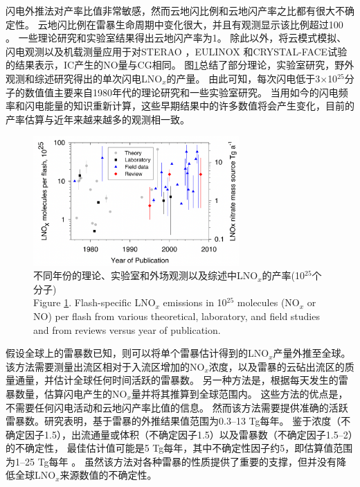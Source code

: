

闪电外推法对产率比值非常敏感\citep{Bond.2002}，然而云地闪比例和云地闪产率之比都有很大不确定性。
云地闪比例在雷暴生命周期中变化很大，并且有观测显示该比例超过100 \citep{Dye.2000,DeCaria.2005,Ott.2007}。
一些理论研究\citep{Cooray.1997}和实验室结果\citep{Cooray.2005}得出云地闪产率为1。
除此以外，将云模式模拟、闪电观测以及机载测量应用于对STERAO \citep{DeCaria.2000}，EULINOX \citep{Fehr.2004}和CRYSTAL-FACE试验的结果表示，IC产生的NO量与CG相同。
图\ref{figure:lnox_production_Schumann}总结了部分理论，实验室研究，野外观测和综述研究得出的单次闪电LNO$_x$的产量。
由此可知，每次闪电低于3$\times$10$^{25}$分子的数值值主要来自1980年代的理论研究和一些实验室研究。
当用如今的闪电频率和闪电能量的知识重新计算，这些早期结果中的许多数值将会产生变化，目前的产率估算与近年来越来越多的观测相一致。


\begin{figure}[htbp]
\centering
\includegraphics[width=0.7\textwidth]{./figures/lnox_production_Schumann.png}
\caption{不同年份的理论、实验室和外场观测以及综述中LNO$_x$的产率(10$^{25}$个分子)\\
Figure \ref{figure:lnox_production_Schumann}.
Flash-specific LNO$_x$ emissions in 10$^{25}$ molecules (NO$_x$ or NO) per flash from various theoretical, laboratory, and field studies and from reviews versus year of publication.
}
\label{figure:lnox_production_Schumann}
\end{figure}


假设全球上的雷暴数已知，则可以将单个雷暴估计得到的LNO$_x$产量外推至全球\citep{Chameides.1987,Huntrieser.1998,Huntrieser.2002}。
该方法需要测量出流区相对于入流区增加的NO$_x$浓度，以及雷暴的云砧出流区的质量通量，并估计全球任何时间活跃的雷暴数。
另一种方法是，根据每天发生的雷暴数量，估算闪电产生的NO$_x$量并将其推算到全球范围内\citep{Ridley.2004}。 这些方法的优点是，不需要任何闪电活动和云地闪产率比值的信息。
然而该方法需要提供准确的活跃雷暴数。研究表明，基于雷暴的外推结果值范围为0.3--13 Tg每年。
鉴于浓度（不确定因子1.5），出流通量或体积（不确定因子1.5）以及雷暴数（不确定因子1.5--2）的不确定性，
最佳估计值可能是5 Tg每年，其中不确定性因子约5，即估算值范围为1--25 Tg每年 \citep{Chameides.1987}。
虽然该方法对各种雷暴的性质提供了重要的支撑，但并没有降低全球LNO$_x$来源数值的不确定性。

